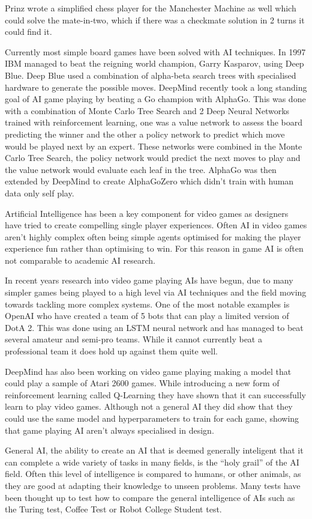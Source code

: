 \documentclass[a4paper]{article}
\begin{document}
Prinz wrote a simplified chess player for the Manchester Machine as well which could solve the mate-in-two, which if there was a checkmate solution in 2 turns it could find it\cite{BreifHistoryComputing}.
\par
Currently most simple board games have been solved with AI techniques.
In 1997 IBM managed to beat the reigning world champion, Garry Kasparov, using Deep Blue.
Deep Blue used a combination of alpha-beta search trees with specialised hardware to generate the possible moves\cite{deepBlue}.
DeepMind recently took a long standing goal of AI game playing by beating a Go champion with AlphaGo\cite{AlphaGo}.
This was done with a combination of Monte Carlo Tree Search and 2 Deep Neural Networks trained with reinforcement learning, one was a value network to assess the board predicting the winner and the other a policy network to predict which move would be played next by an expert.
These networks were combined in the Monte Carlo Tree Search, the policy network would predict the next moves to play and the value network would evaluate each leaf in the tree.
AlphaGo was then extended by DeepMind to create AlphaGoZero which didn't train with human data only self play\cite{alphaGoZero}.
\par
Artificial Intelligence has been a key component for video games as designers have tried to create compelling single player experiences.
Often AI in video games aren't highly complex often being simple agents optimised for making the player experience fun rather than optimising to win.
For this reason in game AI is often not comparable to academic AI research.
\par
In recent years research into video game playing AIs have begun, due to many simpler games being played to a high level via AI techniques and the field moving towards tackling more complex systems.
One of the most notable examples is OpenAI who have created a team of 5 bots that can play a limited version of DotA 2\cite{OpenAIFive}.
This was done using an LSTM neural network and has managed to beat several amateur and semi-pro teams.
While it cannot currently beat a professional team it does hold up against them quite well.
\par
DeepMind has also been working on video game playing making a model that could play a sample of Atari 2600 games\cite{playingAtari}.
While introducing a new form of reinforcement learning called Q-Learning they have shown that it can successfully learn to play video games.
Although not a general AI they did show that they could use the same model and hyperparameters to train for each game, showing that game playing AI aren't always specialised in design.
\par
General AI, the ability to create an AI that is deemed generally inteligent that it can complete a wide variety of tasks in many fields, is the ``holy grail'' of the AI field.
Often this level of intelligence is compared to humans, or other animals, as they are good at adapting their knowledge to unseen problems.
Many tests have been thought up to test how to compare the general intelligence of AIs such as the Turing test, Coffee Test or Robot College Student test\cite{AGITests}.
\end{document}
